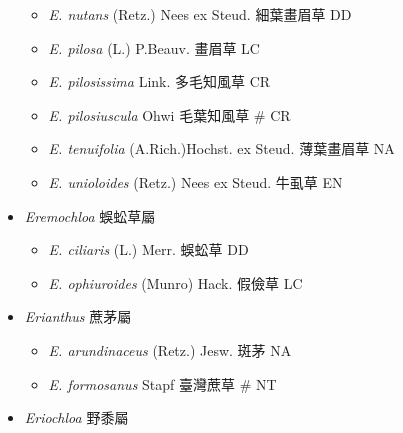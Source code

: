 \begin{itemize}
\begin{itemize}
        \item[] \textit{E. nutans} (Retz.) Nees ex Steud.  細葉畫眉草   DD
        \item[] \textit{E. pilosa} (L.) P.Beauv.  畫眉草   LC
        \item[] \textit{E. pilosissima} Link.  多毛知風草   CR
        \item[] \textit{E. pilosiuscula} Ohwi  毛葉知風草  \# CR
        \item[] \textit{E. tenuifolia} (A.Rich.)Hochst. ex Steud.  薄葉畫眉草   NA
        \item[] \textit{E. unioloides} (Retz.) Nees ex Steud.  牛虱草   EN
  \end{itemize}
 \item[] \textit{Eremochloa} 蜈蚣草屬
                                
  \begin{itemize}
        \item[] \textit{E. ciliaris} (L.) Merr.  蜈蚣草   DD
        \item[] \textit{E. ophiuroides} (Munro) Hack.  假儉草   LC
  \end{itemize}
 \item[] \textit{Erianthus} 蔗茅屬
                                
  \begin{itemize}
        \item[] \textit{E. arundinaceus} (Retz.) Jesw.  斑茅   NA
        \item[] \textit{E. formosanus} Stapf  臺灣蔗草  \# NT
  \end{itemize}
 \item[] \textit{Eriochloa} 野黍屬
                                

\end{itemize}
